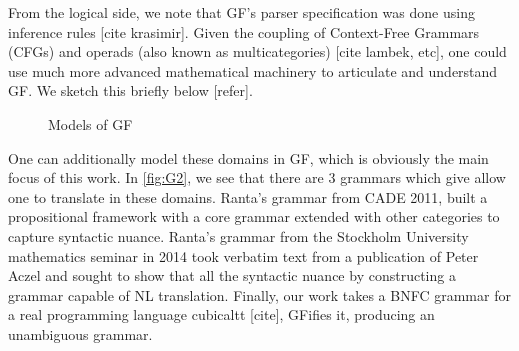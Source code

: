 From the logical side, we note that GF's parser specification was done using
inference rules [cite krasimir]. Given the coupling of Context-Free Grammars
(CFGs) and operads (also known as multicategories) [cite lambek, etc], one could use much more
advanced mathematical machinery to articulate and understand GF.  We sketch this
briefly below [refer].

\begin{figure}[H]
\centering
{}
\caption{Models of GF} \label{fig:G1}
\end{figure}

One can additionally model these domains in GF, which is obviously the main
focus of this work. In \autoref{fig:G2}, we see that there are 3 grammars which
give allow one to translate in these domains. Ranta's grammar from CADE 2011,
built a propositional framework with a core grammar extended with other
categories to capture syntactic nuance. Ranta's grammar from the Stockholm University
mathematics seminar in 2014 took verbatim text from a publication of Peter Aczel
and sought to show that all the syntactic nuance by constructing a grammar
capable of NL translation. Finally, our work takes a BNFC grammar for a real
programming language cubicaltt [cite], GFifies it, producing an unambiguous
grammar.


